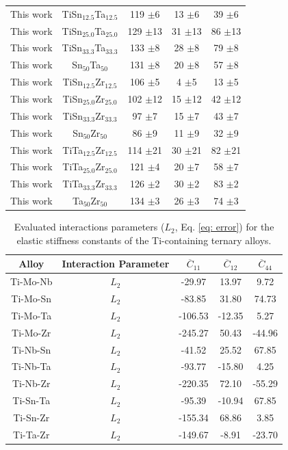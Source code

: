 \begin{longtable}[H]{ c c c c c }
	This work & TiSn$_{12.5}$Ta$_{12.5}$ & 119 $\pm$6 & 13 $\pm$6 & 39 $\pm$6\\
	This work & TiSn$_{25.0}$Ta$_{25.0}$ & 129 $\pm$13 & 31 $\pm$13 & 86 $\pm$13\\
	This work & TiSn$_{33.3}$Ta$_{33.3}$ & 133 $\pm$8 & 28 $\pm$8 & 79 $\pm$8\\
	This work & Sn$_{50}$Ta$_{50}$ & 131 $\pm$8 & 20 $\pm$8 & 57 $\pm$8\\
	This work & TiSn$_{12.5}$Zr$_{12.5}$ & 106 $\pm$5 & 4 $\pm$5 & 13 $\pm$5\\
	This work & TiSn$_{25.0}$Zr$_{25.0}$ & 102 $\pm$12 & 15 $\pm$12 & 42 $\pm$12\\
	This work & TiSn$_{33.3}$Zr$_{33.3}$ & 97 $\pm$7 & 15 $\pm$7 & 43 $\pm$7\\
	This work & Sn$_{50}$Zr$_{50}$ & 86 $\pm$9 & 11 $\pm$9 & 32 $\pm$9\\
	This work & TiTa$_{12.5}$Zr$_{12.5}$ & 114 $\pm$21 & 30 $\pm$21 & 82 $\pm$21\\
	This work & TiTa$_{25.0}$Zr$_{25.0}$ & 121 $\pm$4 & 20 $\pm$7 & 58 $\pm$7\\
	This work & TiTa$_{33.3}$Zr$_{33.3}$ & 126 $\pm$2 & 30 $\pm$2 & 83 $\pm$2\\
	This work & Ta$_{50}$Zr$_{50}$ & 134 $\pm$3 & 26 $\pm$3 & 74 $\pm$3\\
	\hline
\end{longtable}

\newpage
\begin{table}[H]
	\caption{Evaluated interactions parameters ($L_2$, Eq. \ref{eq: error}) for the elastic stiffness constants of the Ti-containing ternary alloys.}
	\centering
	\begin{tabular}{ c c c c c }
		\hline
		Alloy & Interaction Parameter & $\overline{C}_{11}$ & $\overline{C}_{12}$ & $\overline{C}_{44}$\\
		\hline
		Ti-Mo-Nb & $L_2$ & -29.97 & 13.97 & 9.72\\
		Ti-Mo-Sn & $L_2$ & -83.85 & 31.80 & 74.73\\
		Ti-Mo-Ta & $L_2$ & -106.53 & -12.35 & 5.27\\
		Ti-Mo-Zr & $L_2$ & -245.27 & 50.43 & -44.96\\
		Ti-Nb-Sn & $L_2$ & -41.52 & 25.52 & 67.85\\
		Ti-Nb-Ta & $L_2$ & -93.77 & -15.80 & 4.25\\
		Ti-Nb-Zr & $L_2$ & -220.35 & 72.10 & -55.29\\
		Ti-Sn-Ta & $L_2$ & -95.39 & -10.94 & 67.85\\
		Ti-Sn-Zr & $L_2$ &  -155.34 & 68.86 & 3.85\\
		Ti-Ta-Zr & $L_2$ & -149.67 & -8.91 & -23.70\\		
		\hline
	\end{tabular}
	\label{Ch6-table:tixyelasip}
\end{table}
\clearpage



